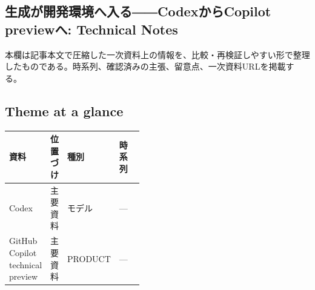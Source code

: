 \subsection*{生成が開発環境へ入る――CodexからCopilot previewへ: Technical Notes}
本欄は記事本文で圧縮した一次資料上の情報を、比較・再検証しやすい形で整理したものである。時系列、確認済みの主張、留意点、一次資料URLを掲載する。
\medskip
\subsection*{Theme at a glance}
\begin{center}
\footnotesize
\begin{tabularx}{\linewidth}{@{}p{0.20\linewidth}p{0.10\linewidth}p{0.14\linewidth}X@{}}
\toprule
資料 & 位置づけ & 種別 & 時系列 \\
\midrule
Codex & 主要資料 & モデル & — \\
GitHub Copilot technical preview & 主要資料 & PRODUCT & — \\
\bottomrule
\end{tabularx}
\end{center}
\normalsize

